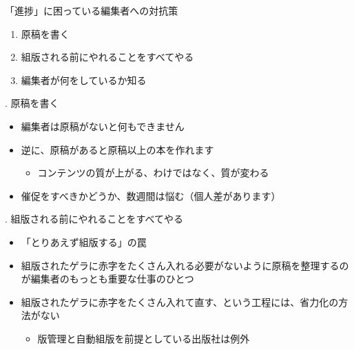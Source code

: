 \documentclass[14pt,dvipdfmx,uplatex]{beamer}
\begin{document}
\begin{frame}[t]{\leavevmode\inhibitglue 「進捗」に困っている編集者への対抗策}
  \sffamily
  \begin{enumerate}
      \item 原稿を書く
      \item 組版される前にやれることをすべてやる
      \item 編集者が何をしているか知る
  \end{enumerate}
\end{frame}

\begin{frame}[t]{. 原稿を書く}
  \sffamily
  \begin{itemize}
    \item 編集者は原稿がないと何もできません
    \item 逆に、原稿があると原稿以上の本を作れます\\
    \begin{itemize}
      \item コンテンツの質が上がる、わけではなく、質が変わる
    \end{itemize}
    \item 催促をすべきかどうか、数週間は悩む（個人差があります）
  \end{itemize}
\end{frame}

\begin{frame}[t]{. 組版される前にやれることをすべてやる}
  \sffamily
  \begin{itemize}
    \item \< 「とりあえず組版する」の罠
    \item 組版されたゲラに赤字をたくさん入れる必要がないように原稿を整理するのが編集者のもっとも重要な仕事のひとつ
    \item 組版されたゲラに赤字をたくさん入れて直す、という工程には、省力化の方法がない
    \begin{itemize}
      \item 版管理と自動組版を前提としている出版社は例外
    \end{itemize}
  \end{itemize}
\end{frame}
\end{document}
